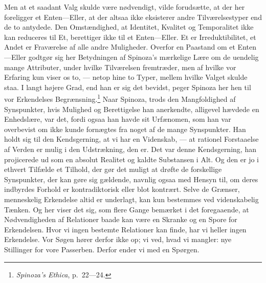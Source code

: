 \documentclass[12pt]{article}
\newcommand{\opage}[1]{\marginnote{\footnotesize\textit{[#1]}}}
\begin{document}
Men at et saadant Valg skulde være nødvendigt, vilde forudsætte, at der her
foreligger et Enten---Eller, at der altsaa ikke eksisterer andre
Tilværelsestyper end de to antydede. Den Omstændighed, at Identitet,
Kvalitet og Temporalitet ikke kan reduceres til Et, berettiger ikke til et
Enten---Eller. Et er Irreduktibilitet, et Andet er Fraværelse af alle andre
Muligheder. Overfor en Paastand om et Enten---Eller godtgør sig her
Betydningen af Spinoza's mærkelige Lære om de uendelig mange Attributer,
under hvilke Tilværelsen fremtræder, men af hvilke vor Erfaring kun viser
os to, --- netop hine to Typer, mellem hvilke Valget skulde staa. I langt
højere Grad, end han er sig det bevidst, peger Spinoza her hen til vor
Erkendelses Begrænsning.\footnote{\textit{Spinoza's \guillemotright
Ethica\guillemotleft}, p.~22---24.} Naar Spinoza, trods den Mangfoldighed
af Synspunkter, hvis Mulighed og Berettigelse han anerkendte, alligevel
hævdede en Enhedslære, var det, fordi ogsaa han havde sit Urfænomen, som
han var overbevist om ikke kunde fornægtes fra noget af de mange
Synspunkter. Han holdt sig til den Kendsgerning, at vi har en Videnskab,
--- at rationel Forstaaelse af Verden er mulig i den Udstrækning, den er.
Det var denne Kendsgerning, han projicerede ud som en absolut Realitet og
kaldte Substansen i Alt. Og den er jo i ethvert Tilfælde et Tilhold, der
gør det muligt at drøfte de forskellige Synspunkter, der kan gøre sig
gældende, navnlig ogsaa med Hensyn til, om deres indbyrdes
\opage{101} \setcounter{footnote}{0}
Forhold er kontradiktorisk eller blot kontrært. Selve de Grænser,
menneskelig Erkendelse altid er underlagt, kan kun bestemmes ved
videnskabelig Tænken. Og her viser det sig, som flere Gange bemærket i det
foregaaende, at Nødvendigheden af Relationer baade kan være en Skranke og
en Spore for Erkendelsen. Hvor vi ingen bestemte Relationer kan finde, har
vi heller ingen Erkendelse. Vor Søgen hører derfor ikke op; vi ved, hvad vi
mangler: nye Stillinger for vore Passerben. Derfor ender vi med en Spørgen.
\end{document}
